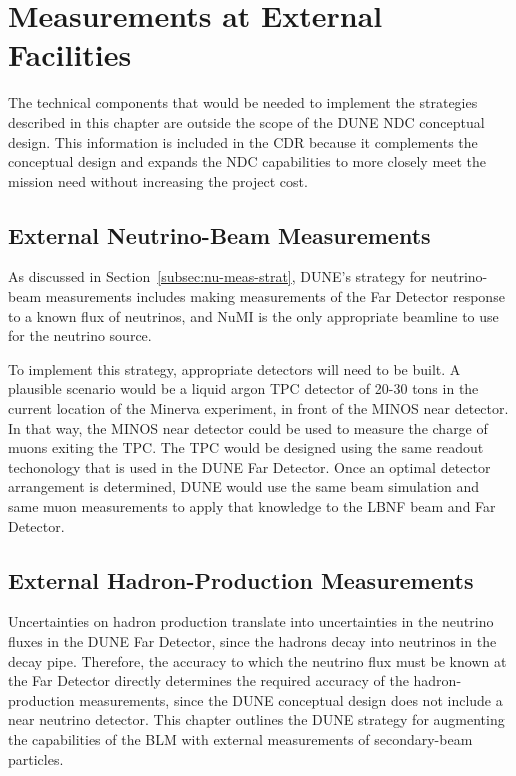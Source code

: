 
\chapter{Measurements at External Facilities}
\label{ch:nd-external-meas}


The technical components that would be needed to implement the strategies 
described in this chapter are outside the scope of the DUNE NDC conceptual 
design. This information is included in the CDR because it complements the conceptual 
design and expands the NDC capabilities to more closely meet the mission need without increasing the project cost.


\section{External Neutrino-Beam Measurements}
\label{sec:nd-external-beam}

As discussed in Section~\ref{subsec:nu-meas-strat}, DUNE's strategy for neutrino-beam measurements includes making measurements of the Far Detector response to a known flux of neutrinos, and NuMI is the only appropriate beamline to use for the neutrino source.

To implement this strategy, appropriate detectors will need to be built.  A plausible scenario would be a liquid argon TPC detector of 20-30 tons in the current location of the Minerva experiment, in front of the MINOS near detector. In that way, the MINOS near detector could be used to measure the charge of muons exiting the TPC. The TPC would be designed using the same readout techonology that is used in the DUNE Far Detector.  Once an optimal detector arrangement is determined, DUNE would use the same beam simulation and same muon measurements to apply that knowledge to the LBNF beam and Far Detector.

\section{External Hadron-Production Measurements}
\label{sec:nd-external-hadron}

Uncertainties on hadron production translate into uncertainties in the neutrino fluxes in the DUNE Far Detector, since the hadrons decay into neutrinos in the decay pipe.  
Therefore, the accuracy to which the neutrino flux must be known at the Far Detector directly determines the required accuracy 
of the hadron-production measurements, since the DUNE conceptual design does not include a near neutrino detector. This chapter outlines the DUNE strategy for augmenting the capabilities of the BLM with external measurements of secondary-beam particles.  


